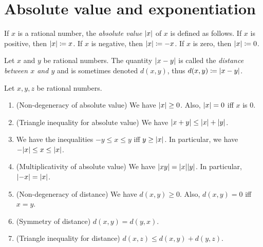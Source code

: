 \section{Absolute value and exponentiation}\label{sec:4.3}

\begin{defn}\label{4.3.1}
  If \(x\) is a rational number, the \emph{absolute value} \(\left\lvert x\right\rvert\) of \(x\) is defined as follows.
  If \(x\) is positive, then \(\left\lvert x\right\rvert \coloneqq x\).
  If \(x\) is negative, then \(\left\lvert x\right\rvert \coloneqq -x\).
  If \(x\) is zero, then \(\left\lvert x\right\rvert \coloneqq 0\).
\end{defn}

\begin{defn}[Distance]\label{4.3.2}
  Let \(x\) and \(y\) be rational numbers.
  The quantity \(\left\lvert x - y\right\rvert\) is called the \emph{distance between \(x\) and \(y\)} and is sometimes denoted \(d(x, y)\), thus \(d(x, y) \coloneqq \left\lvert x - y\right\rvert\).
\end{defn}

\begin{prop}\label{4.3.3}
  Let \(x, y, z\) be rational numbers.
  \begin{enumerate}
    \item (Non-degeneracy of absolute value)
          We have \(\left\lvert x\right\rvert \geq 0\).
          Also, \(\left\lvert x\right\rvert = 0\) iff \(x\) is \(0\).
    \item (Triangle inequality for absolute value)
          We have \(\left\lvert x + y\right\rvert \leq \left\lvert x\right\rvert + \left\lvert y\right\rvert\).
    \item We have the inequalities \(-y \leq x \leq y\) iff \(y \geq \left\lvert x\right\rvert\).
          In particular, we have \(-\abs{x} \leq x \leq \abs{x}\).
    \item (Multiplicativity of absolute value)
          We have \(\abs{xy} = \abs{x} \abs{y}\).
          In particular, \(\left\lvert-x\right\rvert = \left\lvert x\right\rvert\).
    \item (Non-degeneracy of distance)
          We have \(d(x, y) \geq 0\).
          Also, \(d(x, y) = 0\) iff \(x = y\).
    \item (Symmetry of distance)
          \(d(x, y) = d(y, x)\).
    \item (Triangle inequality for distance)
          \(d(x, z) \leq d(x, y) + d(y, z)\).
  \end{enumerate}
\end{prop}

